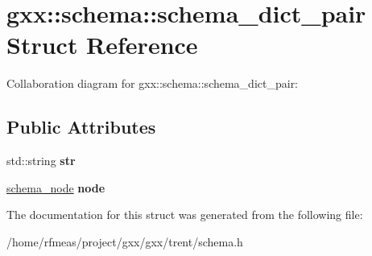 \hypertarget{structgxx_1_1schema_1_1schema__dict__pair}{}\section{gxx\+:\+:schema\+:\+:schema\+\_\+dict\+\_\+pair Struct Reference}
\label{structgxx_1_1schema_1_1schema__dict__pair}


Collaboration diagram for gxx\+:\+:schema\+:\+:schema\+\_\+dict\+\_\+pair\+:
\subsection*{Public Attributes}
\begin{DoxyCompactItemize}
\item 
std\+::string {\bfseries str}\hypertarget{structgxx_1_1schema_1_1schema__dict__pair_a33fea5ba2b66a44caca6298e0a56f11d}{}\label{structgxx_1_1schema_1_1schema__dict__pair_a33fea5ba2b66a44caca6298e0a56f11d}

\item 
\hyperlink{classgxx_1_1schema_1_1schema__node}{schema\+\_\+node} {\bfseries node}\hypertarget{structgxx_1_1schema_1_1schema__dict__pair_a08294023fb7008e225d03b4ac5e9d710}{}\label{structgxx_1_1schema_1_1schema__dict__pair_a08294023fb7008e225d03b4ac5e9d710}

\end{DoxyCompactItemize}


The documentation for this struct was generated from the following file\+:\begin{DoxyCompactItemize}
\item 
/home/rfmeas/project/gxx/gxx/trent/schema.\+h\end{DoxyCompactItemize}
